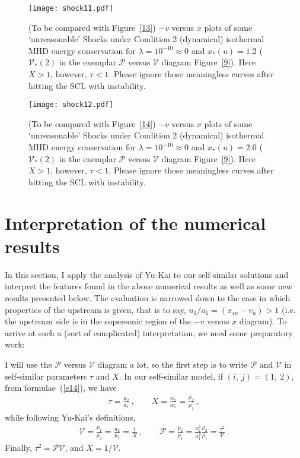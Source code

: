 \documentclass[fleqn,usenatbib]{mnras}
\begin{document}
\begin{figure}
\centering
\texttt{[image: shock11.pdf]}
\caption{(To be compared with Figure~\ref{13}) $-v$ versus $x$ plots of some `unreasonable' Shocks under Condition 2 (dynamical) isothermal MHD energy conservation for $\lambda=10^{-10}\approx 0$ and $x_{*}(u)=1.2$ ($\mathcal{V}_{*}(2)$ in the exemplar $\mathcal{P}$ versus $\mathcal{V}$ diagram Figure~\ref{9}). Here $X>1$, however, $\tau<1$. Please ignore those meaningless curves after hitting the SCL with instability.}
\label{5}
\end{figure}

\begin{figure}
\centering
\texttt{[image: shock12.pdf]}
\caption{(To be compared with Figure~\ref{14}) $-v$ versus $x$ plots of some `unreasonable' Shocks under Condition 2 (dynamical) isothermal MHD energy conservation for $\lambda=10^{-10}\approx 0$ and $x_{*}(u)=2.0$ ($\mathcal{V}_{*}(2)$ in the exemplar $\mathcal{P}$ versus $\mathcal{V}$ diagram Figure~\ref{9}). Here $X>1$, however, $\tau<1$. Please ignore those meaningless curves after hitting the SCL with instability.}
\label{6}
\end{figure}

\section{Interpretation of the numerical results}
In this section, I apply the analysis of Yu-Kai to our self-similar solutions and interpret the features found in the above numerical results as well as some new results presented below. The evaluation is narrowed down to the case in which properties of the upstream is given, that is to say, $u_{1}/a_{1}=(x_{su}-v_{u})>1$ (i.e. the upstream side is in the supersonic region of the $-v$ versus $x$ diagram). To arrive at such a (sort of complicated) interpretation, we need some preparatory work:

I will use the $\mathcal{P}$ versus $\mathcal{V}$ diagram a lot, so the first step is to write $\mathcal{P}$ and $\mathcal{V}$ in self-similar parameters $\tau$ and $X$. In our self-similar model, if $(i,\ j)=(1,\ 2)$, from formulae~(\ref{e14}), we have 
\begin{gather}
\tau=\frac{a_{2}}{a_{1}}\ ,\qquad X=\frac{\alpha_{2}}{\alpha_{1}}=\frac{\rho_{2}}{\rho_{1}}\ ,\label{e41}
\end{gather}
while following Yu-Kai's definitions,
\begin{align}
\mathcal{V}=\frac{\rho_{1}}{\rho_{2}}=\frac{u_{2}}{u_{1}}=\frac{1}{X}\ ,\qquad\mathcal{P}=\frac{p_{2}}{p_{1}}=\frac{a_{2}^{2}}{a_{1}^{2}}\frac{\rho_{2}}{\rho_{1}}=\frac{\tau^{2}}{\mathcal{V}}\ .\label{e42}
\end{align}
Finally, $\tau^{2}=\mathcal{PV}$, and $X=1/\mathcal{V}$.
\end{document}

